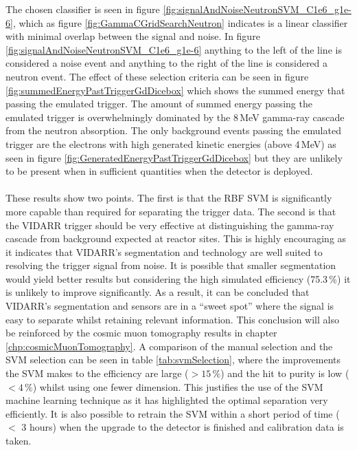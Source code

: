The chosen classifier is seen in figure \ref{fig:signalAndNoiseNeutronSVM_C1e6_g1e-6}, which as figure \ref{fig:GammaCGridSearchNeutron} indicates is a linear classifier with minimal overlap between the signal and noise. In figure \ref{fig:signalAndNoiseNeutronSVM_C1e6_g1e-6} anything to the left of the line is considered a noise event and anything to the right of the line is considered a neutron event. The effect of these selection criteria can be seen in figure \ref{fig:summedEnergyPastTriggerGdDicebox} which shows the summed energy that passing the emulated trigger. The amount of summed energy passing the emulated trigger is overwhelmingly dominated by the 8\,MeV gamma-ray cascade from the neutron absorption. The only background events passing the emulated trigger are the electrons with high generated kinetic energies (above 4\,MeV) as seen in figure \ref{fig:GeneratedEnergyPastTriggerGdDicebox} but they are unlikely to be present when in sufficient quantities when the detector is deployed. 
\\\\These results show two points. The first is that the RBF SVM is significantly more capable than required for separating the trigger data. The second is that the VIDARR trigger should be very effective at distinguishing the gamma-ray cascade from background expected at reactor sites. This is highly encouraging as it indicates that VIDARR's segmentation and technology are well suited to resolving the trigger signal from noise. It is possible that smaller segmentation would yield better results but considering the high simulated efficiency (75.3\,\%) it is unlikely to improve significantly. As a result, it can be concluded that VIDARR's segmentation and sensors are in a ``sweet spot'' where the signal is easy to separate whilst retaining relevant information. This conclusion will also be reinforced by the cosmic muon tomography results in chapter \ref{chp:cosmicMuonTomography}. A comparison of the manual selection and the SVM selection can be seen in table \ref{tab:svmSelection}, where the improvements the SVM makes to the efficiency are large ($> 15\,\%$) and the hit to purity is low ($< 4\,\%$) whilst using one fewer dimension. This justifies the use of the SVM machine learning technique as it has highlighted the optimal separation very efficiently. It is also possible to retrain the SVM within a short period of time ($<$ 3 hours) when the upgrade to the detector is finished and calibration data is taken.  

